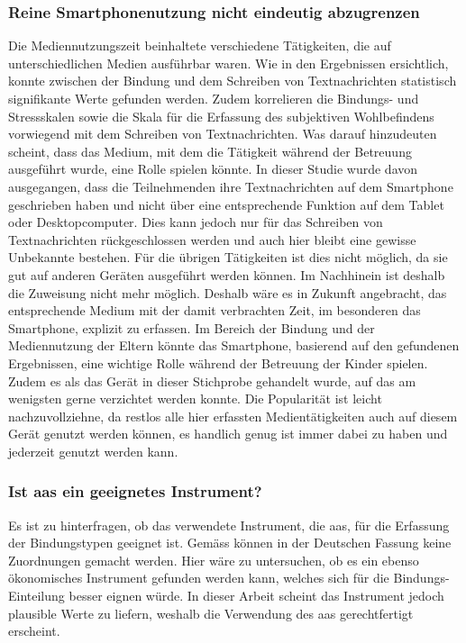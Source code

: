 \subsubsection{Reine Smartphonenutzung nicht eindeutig abzugrenzen}
Die Mediennutzungszeit beinhaltete verschiedene Tätigkeiten, die auf unterschiedlichen Medien ausführbar waren. Wie in den Ergebnissen ersichtlich, konnte zwischen der Bindung und dem Schreiben von Textnachrichten statistisch signifikante Werte gefunden werden. Zudem korrelieren die Bindungs- und Stressskalen sowie die Skala für die Erfassung des subjektiven Wohlbefindens vorwiegend mit dem Schreiben von Textnachrichten. Was darauf hinzudeuten scheint, dass das Medium, mit dem die Tätigkeit während der Betreuung ausgeführt wurde, eine Rolle spielen könnte. In dieser Studie wurde davon ausgegangen, dass die Teilnehmenden ihre Textnachrichten auf dem Smartphone geschrieben haben und nicht über eine entsprechende Funktion auf dem Tablet oder Desktopcomputer. Dies kann jedoch nur für das Schreiben von Textnachrichten rückgeschlossen werden und auch hier bleibt eine gewisse Unbekannte bestehen. Für die übrigen Tätigkeiten ist dies nicht möglich, da sie gut auf anderen Geräten ausgeführt werden können. Im Nachhinein ist deshalb die Zuweisung nicht mehr möglich. Deshalb wäre es in Zukunft angebracht, das entsprechende Medium mit der damit verbrachten Zeit, im besonderen das Smartphone, explizit zu erfassen. Im Bereich der Bindung und der Mediennutzung der Eltern könnte das Smartphone, basierend auf den gefundenen Ergebnissen, eine wichtige Rolle während der Betreuung der Kinder spielen. Zudem es als das Gerät in dieser Stichprobe gehandelt wurde, auf das am wenigsten gerne verzichtet werden konnte. Die Popularität ist leicht nachzuvollziehne, da restlos alle hier erfassten Medientätigkeiten auch auf diesem Gerät genutzt werden können, es handlich genug ist immer dabei zu haben und jederzeit genutzt werden kann. 

\subsubsection{Ist \acrshort{aas} ein geeignetes Instrument?}
Es ist zu hinterfragen, ob das verwendete Instrument, die \acrfull{aas}, für die Erfassung der Bindungstypen geeignet ist. Gemäss  können in der Deutschen Fassung keine Zuordnungen gemacht werden. Hier wäre zu untersuchen, ob es ein ebenso ökonomisches Instrument gefunden werden kann, welches sich für die Bindungs-Einteilung besser eignen würde. In dieser Arbeit scheint das Instrument jedoch plausible Werte zu liefern, weshalb die Verwendung des \acrshort{aas} gerechtfertigt erscheint. 

